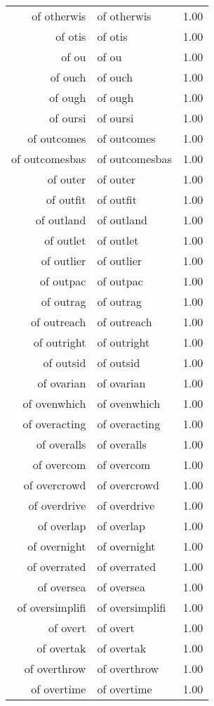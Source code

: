 \begin{table}[ht]
\begin{tabular}{rlr}
  of otherwis & of otherwis & 1.00 \\ 
  of otis & of otis & 1.00 \\ 
  of ou & of ou & 1.00 \\ 
  of ouch & of ouch & 1.00 \\ 
  of ough & of ough & 1.00 \\ 
  of oursi & of oursi & 1.00 \\ 
  of outcomes & of outcomes & 1.00 \\ 
  of outcomesbas & of outcomesbas & 1.00 \\ 
  of outer & of outer & 1.00 \\ 
  of outfit & of outfit & 1.00 \\ 
  of outland & of outland & 1.00 \\ 
  of outlet & of outlet & 1.00 \\ 
  of outlier & of outlier & 1.00 \\ 
  of outpac & of outpac & 1.00 \\ 
  of outrag & of outrag & 1.00 \\ 
  of outreach & of outreach & 1.00 \\ 
  of outright & of outright & 1.00 \\ 
  of outsid & of outsid & 1.00 \\ 
  of ovarian & of ovarian & 1.00 \\ 
  of ovenwhich & of ovenwhich & 1.00 \\ 
  of overacting & of overacting & 1.00 \\ 
  of overalls & of overalls & 1.00 \\ 
  of overcom & of overcom & 1.00 \\ 
  of overcrowd & of overcrowd & 1.00 \\ 
  of overdrive & of overdrive & 1.00 \\ 
  of overlap & of overlap & 1.00 \\ 
  of overnight & of overnight & 1.00 \\ 
  of overrated & of overrated & 1.00 \\ 
  of oversea & of oversea & 1.00 \\ 
  of oversimplifi & of oversimplifi & 1.00 \\ 
  of overt & of overt & 1.00 \\ 
  of overtak & of overtak & 1.00 \\ 
  of overthrow & of overthrow & 1.00 \\ 
  of overtime & of overtime & 1.00 \\ 

\end{tabular}
\end{table}

